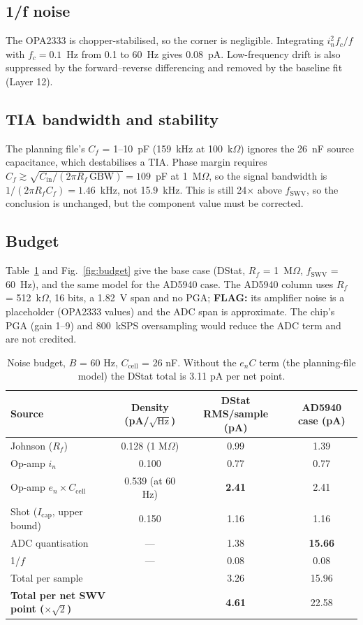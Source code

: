 \documentclass[10pt]{article}
\numberwithin{equation}{section}
\newcommand{\flag}[1]{\textbf{FLAG:} #1}
\begin{document}
\subsection{1/f noise}
The OPA2333 is chopper-stabilised, so the corner is negligible. Integrating $i_n^2 f_c/f$ with $f_c = 0.1$~Hz from 0.1 to 60~Hz gives 0.08~pA. Low-frequency drift is also
suppressed by the forward--reverse differencing and removed by the baseline fit (Layer 12).

\subsection{TIA bandwidth and stability}
The planning file's $C_f$ = 1--10~pF (159~kHz at 100~k$\Omega$) ignores the 26~nF source capacitance, which destabilises a TIA. Phase margin requires
$C_f \gtrsim \sqrt{C_{\text{in}}/(2\pi R_f\,\text{GBW})} = 109$~pF at 1~M$\Omega$, so the signal bandwidth is
$1/(2\pi R_fC_f) = 1.46$~kHz, not 15.9~kHz. This is still 24$\times$ above $f_{\text{SWV}}$, so the conclusion is unchanged, but the component value must be corrected.

\subsection{Budget}
Table~\ref{tab:budget} and Fig.~\ref{fig:budget} give the base case (DStat, $R_f$ = 1~M$\Omega$, $f_{\text{SWV}}$ = 60~Hz), and the same
model for the AD5940 case. The AD5940 column uses $R_f$ = 512~k$\Omega$, 16 bits, a 1.82~V span and no PGA; \flag{its amplifier noise is a placeholder (OPA2333 values) and
the ADC span is approximate. The chip's PGA (gain 1--9) and 800~kSPS oversampling would reduce the ADC term and are not credited.}

\begin{table}[h]
\centering\small
\begin{tabular}{@{}lccc@{}}
\toprule
Source & Density (pA/$\sqrt{\text{Hz}}$) & DStat RMS/sample (pA) & AD5940 case (pA) \\
\midrule
Johnson ($R_f$) & 0.128 (1 M$\Omega$) & 0.99 & 1.39 \\
Op-amp $i_n$ & 0.100 & 0.77 & 0.77 \\
Op-amp $e_n \times C_{\text{cell}}$ & 0.539 (at 60 Hz) & \textbf{2.41} & 2.41 \\
Shot ($I_{\text{cap}}$, upper bound) & 0.150 & 1.16 & 1.16 \\
ADC quantisation & --- & 1.38 & \textbf{15.66} \\
1/$f$ & --- & 0.08 & 0.08 \\
\midrule
Total per sample & & 3.26 & 15.96 \\
\textbf{Total per net SWV point ($\times\sqrt{2}$)} & & \textbf{4.61} & 22.58 \\
\bottomrule
\end{tabular}
\caption{Noise budget, $B$ = 60 Hz, $C_{\text{cell}}$ = 26 nF. Without the $e_n C$ term (the planning-file model) the DStat total is 3.11 pA per net point.}\label{tab:budget}
\end{table}
\end{document}
